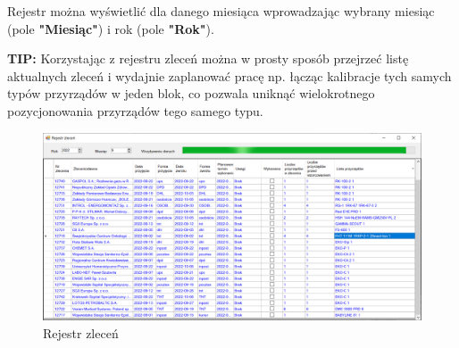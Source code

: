 Rejestr można wyświetlić dla danego miesiąca wprowadzając wybrany miesiąc (pole \textbf{"Miesiąc"}) i rok (pole \textbf{"Rok"}). 

\textbf{TIP:} Korzystając z rejestru zleceń można w prosty sposób przejrzeć listę aktualnych zleceń i wydajnie zaplanować pracę np. łącząc kalibracje tych samych typów przyrządów w jeden blok, co pozwala uniknąć wielokrotnego pozycjonowania przyrządów tego samego typu.

\begin{figure}
	\centering
	\includegraphics[width=\columnwidth]{obrazki/Biuro/rejestr_zlecen.png}
	\caption{Rejestr zleceń}
	\label{rejestrZlecen}
\end{figure}
